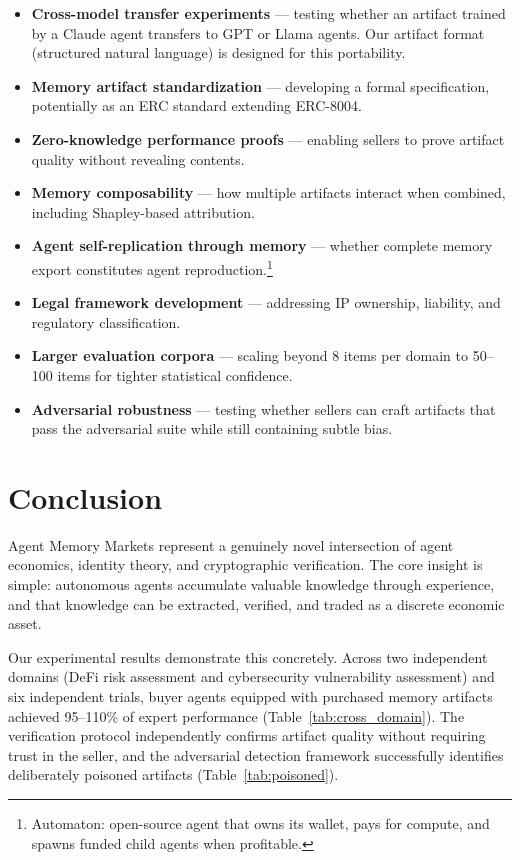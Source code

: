 \documentclass[11pt]{article}
\begin{document}
\begin{itemize}[leftmargin=2em]
  \item \textbf{Cross-model transfer experiments} --- testing whether an artifact trained by a Claude agent transfers to GPT or Llama agents. Our artifact format (structured natural language) is designed for this portability.
  \item \textbf{Memory artifact standardization} --- developing a formal specification, potentially as an ERC standard extending ERC-8004.
  \item \textbf{Zero-knowledge performance proofs} --- enabling sellers to prove artifact quality without revealing contents.
  \item \textbf{Memory composability} --- how multiple artifacts interact when combined, including Shapley-based attribution.
  \item \textbf{Agent self-replication through memory} --- whether complete memory export constitutes agent reproduction.\footnote{Automaton: open-source agent that owns its wallet, pays for compute, and spawns funded child agents when profitable.}
  \item \textbf{Legal framework development} --- addressing IP ownership, liability, and regulatory classification.
  \item \textbf{Larger evaluation corpora} --- scaling beyond 8 items per domain to 50--100 items for tighter statistical confidence.
  \item \textbf{Adversarial robustness} --- testing whether sellers can craft artifacts that pass the adversarial suite while still containing subtle bias.
\end{itemize}

\section{Conclusion}
\label{sec:conclusion}

Agent Memory Markets represent a genuinely novel intersection of agent economics, identity theory, and cryptographic verification. The core insight is simple: autonomous agents accumulate valuable knowledge through experience, and that knowledge can be extracted, verified, and traded as a discrete economic asset.

Our experimental results demonstrate this concretely. Across two independent domains (DeFi risk assessment and cybersecurity vulnerability assessment) and six independent trials, buyer agents equipped with purchased memory artifacts achieved 95--110\% of expert performance (Table~\ref{tab:cross_domain}). The verification protocol independently confirms artifact quality without requiring trust in the seller, and the adversarial detection framework successfully identifies deliberately poisoned artifacts (Table~\ref{tab:poisoned}).
\end{document}
